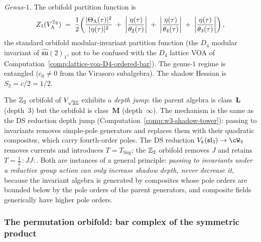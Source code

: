 \begin{computation}
\smallskip
\noindent
\emph{Genus-$1$.}
The orbifold partition function is
\begin{equation}\label{eq:z2-orbifold-partition}
Z_1(V_\Lambda^{\mathbb{Z}_2})
\;=\;
\frac{1}{2}\biggl(
\frac{|\Theta_\Lambda(\tau)|^2}{|\eta(\tau)|^2}
\;+\;
\biggl|\frac{\eta(\tau)}{\theta_2(\tau)}\biggr|
\;+\;
\biggl|\frac{\eta(\tau)}{\theta_4(\tau)}\biggr|
\;+\;
\biggl|\frac{\eta(\tau)}{\theta_3(\tau)}\biggr|
\biggr)\,,
\end{equation}
the standard orbifold modular-invariant partition function
(the $D_4$ modular invariant of $\widehat{\mathfrak{su}}(2)_1$,
not to be confused with the $D_4$ lattice VOA of
Computation~\ref{comp:lattice-voa-D4-ordered-bar}).
The genus-$1$ regime is entangled
($c_0 \ne 0$ from the Virasoro subalgebra).
The shadow Hessian is $S_2 = c/2 = 1/2$.
\end{computation}


\begin{remark}%
\label{rem:orbifold-depth-jump}%
%
%
%
The $\mathbb{Z}_2$ orbifold of $V_{\sqrt{2}\mathbb{Z}}$ exhibits a
\emph{depth jump}: the parent algebra is class~$\mathbf{L}$
(depth~$3$) but the orbifold is class~$\mathbf{M}$
(depth~$\infty$). The mechanism is the same as the
DS reduction depth jump
(Computation~\ref{comp:w3-shadow-tower}):
passing to invariants removes simple-pole generators
and replaces them with their quadratic composites,
which carry fourth-order poles. The DS reduction
$V_k(\mathfrak{sl}_3) \to \cW_3$ removes currents and
introduces $T = T_{\mathrm{Sug}}$; the $\mathbb{Z}_2$ orbifold
removes $J$ and retains $T = \tfrac{1}{2}\,{:}JJ{:}$.
Both are instances of a general principle: \emph{passing to
invariants under a reductive group action can only
increase shadow depth, never decrease it}, because the
invariant algebra is generated by composites whose
pole orders are bounded below by the pole orders of the
parent generators, and composite fields generically have
higher pole orders.
\end{remark}


\subsubsection{The permutation orbifold: bar complex of the symmetric product}%
\label{subsubsec:permutation-orbifold-bar}%
%
%

